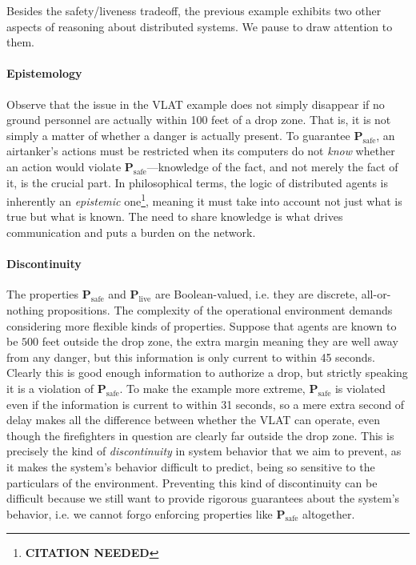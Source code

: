 \documentclass[]             %
{NASA}                       %
\theoremstyle{definition}
\newcommand{\citationneeded}{\footnote{\textbf{CITATION NEEDED}}}
\begin{document}
Besides the safety/liveness tradeoff, the previous example exhibits
two other aspects of reasoning about distributed systems. We pause to
draw attention to them.

\paragraph{Epistemology}
Observe that the issue in the VLAT example does not simply disappear
if no ground personnel are actually within 100 feet of a drop
zone. That is, it is not simply a matter of whether a danger is
actually present. To guarantee \(\textbf{P}_\textrm{safe}\), an
airtanker's actions must be restricted when its computers do not
\emph{know} whether an action would violate
\(\textbf{P}_\textrm{safe}\)---knowledge of the fact, and not merely
the fact of it, is the crucial part. In philosophical terms, the logic
of distributed agents is inherently an \emph{epistemic} one\citationneeded,
meaning it must take into account not just what is true but what is
known. The need to share knowledge is what drives communication and
puts a burden on the network.

\paragraph{Discontinuity}
The properties $\mathbf{P}_\textrm{safe}$ and
$\mathbf{P}_\textrm{live}$ are Boolean-valued, i.e. they are discrete,
all-or-nothing propositions. The complexity of the operational
environment demands considering more flexible kinds of
properties. Suppose that agents are known to be $500$ feet outside the
drop zone, the extra margin meaning they are well away from any
danger, but this information is only current to within 45
seconds. Clearly this is good enough information to authorize a drop,
but strictly speaking it is a violation of
$\mathbf{P}_\textrm{safe}$. To make the example more extreme,
$\mathbf{P}_\textrm{safe}$ is violated even if the information is
current to within 31 seconds, so a mere extra second of delay makes
all the difference between whether the VLAT can operate, even though
the firefighters in question are clearly far outside the drop
zone. This is precisely the kind of \emph{discontinuity} in system
behavior that we aim to prevent, as it makes the system's behavior
difficult to predict, being so sensitive to the particulars of the
environment. Preventing this kind of discontinuity can be difficult
because we still want to provide rigorous guarantees about the
system's behavior, i.e. we cannot forgo enforcing properties like
$\mathbf{P}_\textrm{safe}$ altogether.
\end{document}
